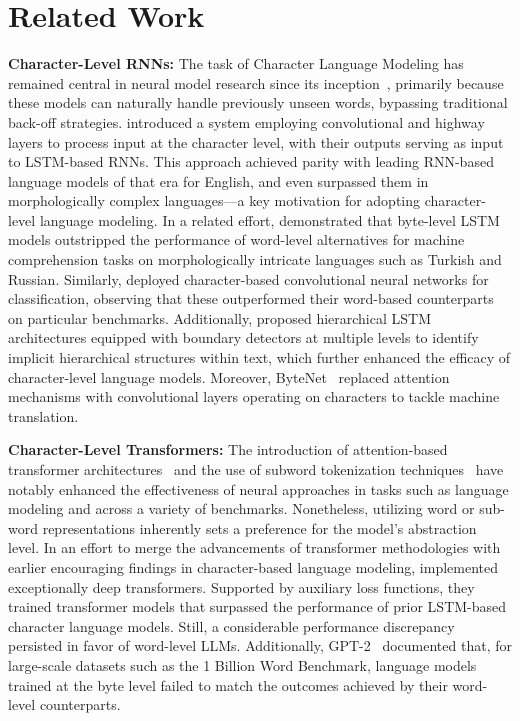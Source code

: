 \section{Related Work}
\label{section:related_work}

\textbf{Character-Level RNNs:} The task of Character Language Modeling has remained central in neural model research since its inception~\citep{sutskever2011generating,mikolov2012subword,graves2013generating}, primarily because these models can naturally handle previously unseen words, bypassing traditional back-off strategies. \cite{kim2016character} introduced a system employing convolutional and highway layers to process input at the character level, with their outputs serving as input to LSTM-based RNNs. This approach achieved parity with leading RNN-based language models of that era for English, and even surpassed them in morphologically complex languages—a key motivation for adopting character-level language modeling. In a related effort, \cite{kenter2018byte} demonstrated that byte-level LSTM models outstripped the performance of word-level alternatives for machine comprehension tasks on morphologically intricate languages such as Turkish and Russian. Similarly, \cite{zhang2015character} deployed character-based convolutional neural networks for classification, observing that these outperformed their word-based counterparts on particular benchmarks. Additionally, \citet{chung2019hierarchical} proposed hierarchical LSTM architectures equipped with boundary detectors at multiple levels to identify implicit hierarchical structures within text, which further enhanced the efficacy of character-level language models. Moreover, ByteNet~\citep{kalchbrenner2016neural} replaced attention mechanisms with convolutional layers operating on characters to tackle machine translation.

\textbf{Character-Level Transformers:} The introduction of attention-based transformer architectures~\citep{vaswani2017attention} and the use of subword tokenization techniques~\citep{sennrich-etal-2016-neural} have notably enhanced the effectiveness of neural approaches in tasks such as language modeling and across a variety of benchmarks. Nonetheless, utilizing word or sub-word representations inherently sets a preference for the model's abstraction level. In an effort to merge the advancements of transformer methodologies with earlier encouraging findings in character-based language modeling, \citet{al2019character} implemented exceptionally deep transformers. Supported by auxiliary loss functions, they trained transformer models that surpassed the performance of prior LSTM-based character language models. Still, a considerable performance discrepancy persisted in favor of word-level LLMs. Additionally, GPT-2~\citep{radfordgpt2} documented that, for large-scale datasets such as the 1 Billion Word Benchmark, language models trained at the byte level failed to match the outcomes achieved by their word-level counterparts.

